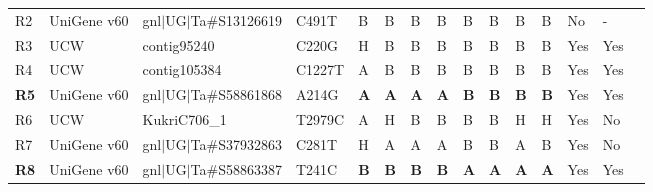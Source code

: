 \begin{sidewaystable}
\begin{localsize}{6}{9}
\begin{tabular}{llllllll!{\extracolsep{4pt}}lllllll}
 R2         & UniGene v60 & gnl$|$UG$|$Ta\#S13126619                                             & C491T  & B      & B         & B        & B        & B            & B         & B         & B     & No            & -                      &                         \\
 R3         & UCW         & contig95240                                                     & C220G  & H      & B         & B        & B        & B            & B         & B         & B     & Yes           & Yes                    &                         \\
 R4         & UCW         & contig105384                                                    & C1227T & A      & B         & B        & B        & B            & B         & B         & B     & Yes           & Yes                    &                         \\
 \textbf{R5}         & UniGene v60 & gnl$|$UG$|$Ta\#S58861868                                             & A214G  & \textbf{A}      & \textbf{A}         & \textbf{A}        & \textbf{A}        & \textbf{B}            & \textbf{B}         & \textbf{B}         & \textbf{B}    & Yes           & Yes                    &                         \\
 R6         & UCW         & KukriC706\_1                                                     & T2979C & A      & H         & B        & B        & B            & B         & H         & H     & Yes           & No                     &                         \\
 R7         & UniGene v60 & gnl$|$UG$|$Ta\#S37932863                                             & C281T  & H      & A         & A        & A        & B            & B         & A         & B     & Yes           & No                     &                         \\
 \textbf{R8}         & UniGene v60 & gnl$|$UG$|$Ta\#S58863387                                             & T241C  & \textbf{B}      & \textbf{B}         & \textbf{B}        & \textbf{B}        & \textbf{A}            & \textbf{A}         & \textbf{A}         & \textbf{A}    & Yes           & Yes                    &                         \\


\end{tabular}
\end{localsize}
\end{sidewaystable}
